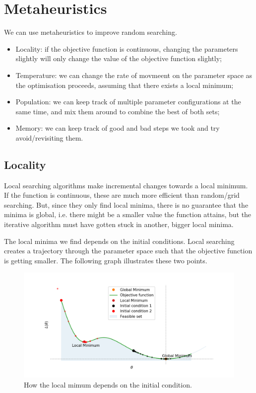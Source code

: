 \documentclass[a4paper, openany]{memoir}
\begin{document}
\section{Metaheuristics}
We can use metaheuristics to improve random searching.
\begin{itemize}
    \item Locality: if the objective function is continuous, changing the parameters slightly will only change the value of the objective function slightly;
    \item Temperature: we can change the rate of movmeent on the parameter space as the optimisation proceeds, assuming that there exists a local minimum;
    \item Population: we can keep track of multiple parameter configurations at the same time, and mix them around to combine the best of both sets;
    \item Memory: we can keep track of good and bad steps we took and try avoid/revisiting them.
\end{itemize}

\subsection{Locality}
Local searching algorithms make incremental changes towards a local minimum. If the function is continuous, these are much more efficient than random/grid searching. But, since they only find local minima, there is no guarantee that the minima is global, i.e. there might be a smaller value the function attains, but the iterative algorithm must have gotten stuck in another, bigger local minima. 

The local minima we find depends on the initial conditions. Local searching creates a trajectory through the parameter space such that the objective function is getting smaller. The following graph illustrates these two points.
\begin{figure}[H]
    \centering
    \includegraphics[scale=0.45]{src/4.16 locality.png}
    \caption{How the local mimum depends on the initial condition.}
\end{figure}
\end{document}
